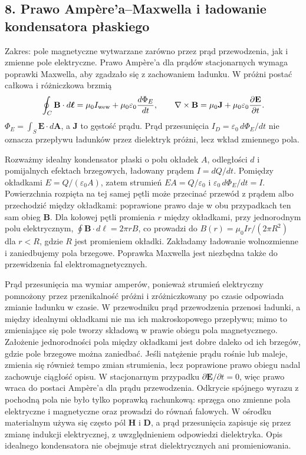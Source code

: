 \documentclass[11pt,a4paper]{article}
\begin{document}
\subsection{8. Prawo Ampère’a--Maxwella i ładowanie kondensatora płaskiego}
Zakres: pole magnetyczne wytwarzane zarówno przez prąd przewodzenia, jak i zmienne pole elektryczne. Prawo Ampère’a dla prądów stacjonarnych wymaga poprawki Maxwella, aby zgadzało się z zachowaniem ładunku. W próżni postać całkowa i różniczkowa brzmią
\[
\oint_C\mathbf B\cdot d\boldsymbol\ell
=\mu_0 I_{\rm wew}+\mu_0\varepsilon_0\frac{d\Phi_E}{dt},\qquad
\nabla\times\mathbf B=\mu_0\mathbf J+\mu_0\varepsilon_0\frac{\partial\mathbf E}{\partial t}.
\]
\(\Phi_E=\int_S\mathbf E\cdot d\mathbf A\), a \(\mathbf J\) to gęstość prądu. Prąd przesunięcia \(I_D=\varepsilon_0\,d\Phi_E/dt\) nie oznacza przepływu ładunków przez dielektryk próżni, lecz wkład zmiennego pola.

Rozważmy idealny kondensator płaski o polu okładek \(A\), odległości \(d\) i pomijalnych efektach brzegowych, ładowany prądem \(I=dQ/dt\). Pomiędzy okładkami \(E=Q/(\varepsilon_0A)\), zatem strumień \(EA=Q/\varepsilon_0\) i \(\varepsilon_0\,d\Phi_E/dt=I\). Powierzchnia rozpięta na tej samej pętli może przecinać przewód z prądem albo przechodzić między okładkami: poprawione prawo daje w obu przypadkach ten sam obieg \(\mathbf B\). Dla kołowej pętli promienia \(r\) między okładkami, przy jednorodnym polu elektrycznym, \(\oint\mathbf B\cdot d\boldsymbol\ell=2\pi rB\), co prowadzi do \(B(r)=\mu_0 I r/(2\pi R^2)\) dla \(r<R\), gdzie \(R\) jest promieniem okładki. Zakładamy ładowanie wolnozmienne i zaniedbujemy pola brzegowe. Poprawka Maxwella jest niezbędna także do przewidzenia fal elektromagnetycznych.

Prąd przesunięcia ma wymiar amperów, ponieważ strumień elektryczny pomnożony przez przenikalność próżni i zróżniczkowany po czasie odpowiada zmianie ładunku w czasie. W przewodniku prąd przewodzenia przenosi ładunki, a między idealnymi okładkami nie ma ich makroskopowego przepływu; mimo to zmieniające się pole tworzy składową w prawie obiegu pola magnetycznego. Założenie jednorodności pola między okładkami jest dobre daleko od ich brzegów, gdzie pole brzegowe można zaniedbać. Jeśli natężenie prądu rośnie lub maleje, zmienia się również tempo zmian strumienia, lecz poprawione prawo obiegu nadal zachowuje ciągłość opisu. W stacjonarnym przypadku \(\partial\mathbf E/\partial t=0\), więc prawo wraca do postaci Ampère’a dla prądu przewodzenia. Odkrycie spójnego wyrazu z pochodną pola nie było tylko poprawką rachunkową: sprzęga ono zmienne pola elektryczne i magnetyczne oraz prowadzi do równań falowych. W ośrodku materialnym używa się często pól \(\mathbf H\) i \(\mathbf D\), a prąd przesunięcia zapisuje się przez zmianę indukcji elektrycznej, z uwzględnieniem odpowiedzi dielektryka. Opis idealnego kondensatora nie obejmuje strat dielektrycznych ani promieniowania.
\end{document}
